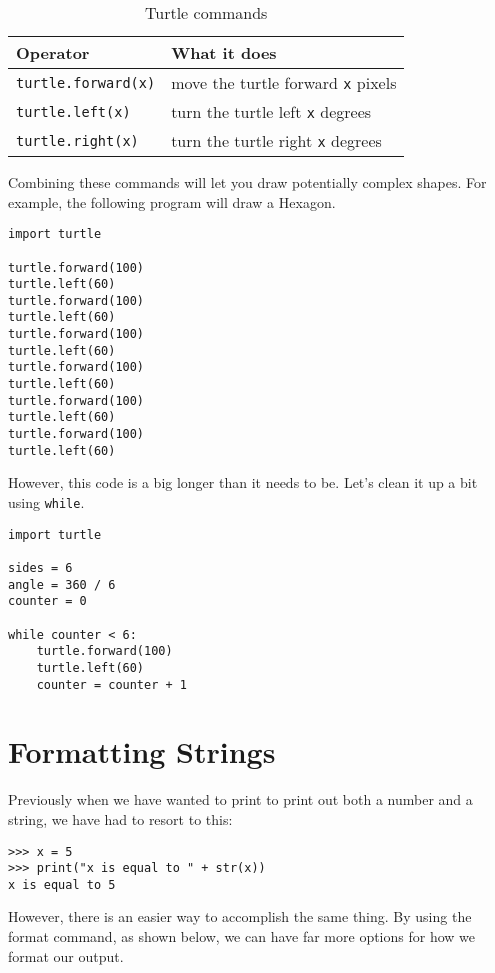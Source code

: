 \documentclass[11pt,hidelinks]{article}
\begin{document}
\begin{table}[h]
  \centering
  \begin{tabular}{ll}
    \toprule
    Operator & What it does\\
    \midrule
    \lstinline!turtle.forward(x)! & move the turtle forward \lstinline!x! pixels \\
    \lstinline!turtle.left(x)! & turn the turtle left \lstinline!x! degrees \\
    \lstinline!turtle.right(x)! & turn the turtle right \lstinline!x! degrees \\
    \bottomrule
  \end{tabular}
  \caption{Turtle commands}
  \label{tab:turtle}
\end{table}

Combining these commands will let you draw potentially complex shapes. For example, the following program will draw a Hexagon.

\begin{lstlisting}[style=python]
import turtle

turtle.forward(100)
turtle.left(60)
turtle.forward(100)
turtle.left(60)
turtle.forward(100)
turtle.left(60)
turtle.forward(100)
turtle.left(60)
turtle.forward(100)
turtle.left(60)
turtle.forward(100)
turtle.left(60)
\end{lstlisting}

However, this code is a big longer than it needs to be. Let's clean it up a bit using \lstinline{while}.

\begin{lstlisting}[style=python]
import turtle

sides = 6
angle = 360 / 6
counter = 0

while counter < 6:
    turtle.forward(100)
    turtle.left(60)
    counter = counter + 1
\end{lstlisting}

\pagebreak
\section{Formatting Strings}
Previously when we have wanted to print to print out both a number and a string, we have had to resort to this:

\begin{lstlisting}[style=ipython]
>>> x = 5
>>> print("x is equal to " + str(x))
x is equal to 5
\end{lstlisting}

However, there is an easier way to accomplish the same thing. By using the format command, as shown below, we can have far more options for how we format our output.
\end{document}
